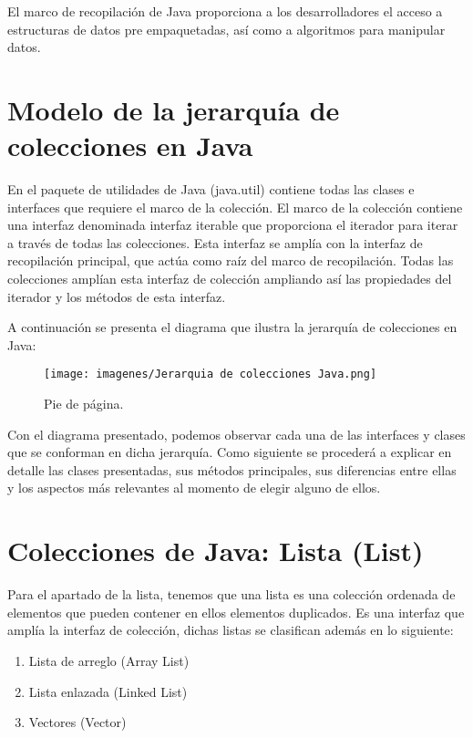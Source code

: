 \documentclass[12pt, letterpaper]{article} %
\begin{document}
El marco de recopilación de Java proporciona a los desarrolladores el acceso a estructuras de datos pre empaquetadas, así como a algoritmos para manipular datos.

\section*{Modelo de la jerarquía de colecciones en Java}
En el paquete de utilidades de Java (java.util) contiene todas las clases e interfaces que requiere el marco de la colección. El marco de la colección contiene una interfaz denominada interfaz iterable que proporciona el iterador para iterar a través de todas las colecciones. Esta interfaz se amplía con la interfaz de recopilación principal, que actúa como raíz del marco de recopilación. Todas las colecciones amplían esta interfaz de colección ampliando así las propiedades del iterador y los métodos de esta interfaz.

A continuación se presenta el diagrama que ilustra la jerarquía de colecciones en Java:
\begin{figure}[h]
    \centering
    \texttt{[image: imagenes/Jerarquia de colecciones Java.png]}
    \caption{Pie de página.}
    \label{fig:jerarquia}
\end{figure}

Con el diagrama presentado, podemos observar cada una de las interfaces y clases que se conforman en dicha jerarquía. Como siguiente se procederá a explicar en detalle  las clases presentadas, sus métodos principales, sus diferencias entre ellas y los aspectos más relevantes al momento de elegir alguno de ellos.

\section{Colecciones de Java: Lista (List)}
Para el apartado de la lista, tenemos que una lista es una colección ordenada de elementos que pueden contener en ellos elementos duplicados. Es una interfaz que amplía la interfaz de colección, dichas listas se clasifican además en lo siguiente:

\begin{enumerate}
    \item Lista de arreglo (Array List)
    \item Lista enlazada (Linked List)
    \item Vectores (Vector)
\end{enumerate}
\end{document}
